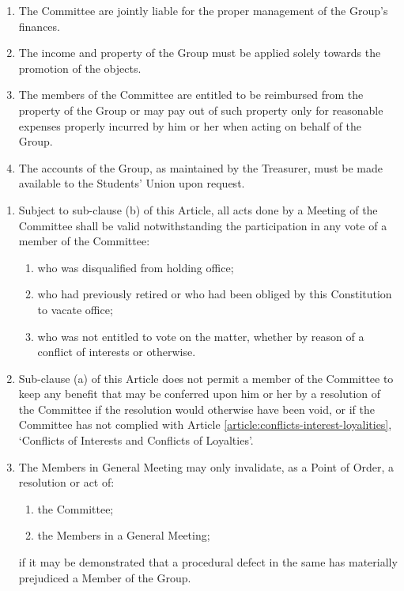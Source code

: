 \documentclass[12pt]{constitution}
\begin{document}

\label{article:financial-management}

\begin{enumerate}
    \item The Committee are jointly liable for the proper management of the Group's finances.
    \item The income and property of the Group must be applied solely towards the promotion of the objects.
    \item The members of the Committee are entitled to be reimbursed from the property of the Group or may pay out of such property only for reasonable expenses properly incurred by him or her when acting on behalf of the Group.
    \item The accounts of the Group, as maintained by the Treasurer, must be made available to the Students' Union upon request.
\end{enumerate}


\label{article:irregularities-saving-provisions}

\begin{enumerate}
    \item Subject to sub-clause (b) of this Article, all acts done by a Meeting of the Committee shall be valid notwithstanding the participation in any vote of a member of the Committee:
    \begin{enumerate}
        \item who was disqualified from holding office;
        \item who had previously retired or who had been obliged by this Constitution to vacate office;
        \item who was not entitled to vote on the matter, whether by reason of a conflict of interests or otherwise.
    \end{enumerate}

    \item Sub-clause (a) of this Article does not permit a member of the Committee to keep any benefit that may be conferred upon him or her by a resolution of the Committee if the resolution would otherwise have been void, or if the Committee has not complied with Article \ref{article:conflicts-interest-loyalities}, `Conflicts of Interests and Conflicts of Loyalties'.
    \item The Members in General Meeting may only invalidate, as a Point of Order, a resolution or act of:
    \begin{enumerate}
        \item the Committee;
        \item the Members in a General Meeting;
    \end{enumerate}
    if it may be demonstrated that a procedural defect in the same has materially prejudiced a Member of the Group.
\end{enumerate}
\end{document}
